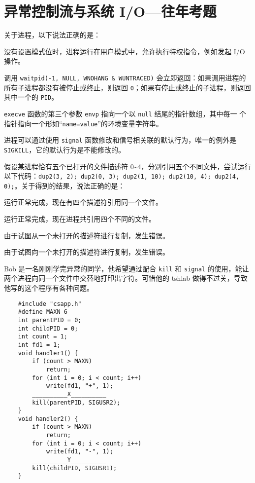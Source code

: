 \chapter{异常控制流与系统 I/O{---}往年考题}\thispagestyle{empty}
    \begin{problems}
         关于进程，以下说法正确的是：
        \begin{choices}
            \item 没有设置模式位时，进程运行在用户模式中，允许执行特权指令，例如发起 I/O 操作。
            \item 调用 \verb|waitpid(-1, NULL, WNOHANG & WUNTRACED)| 会立即返回：如果调用进程的所有子进程都没有被停止或终止，则返回 \verb|0|；如果有停止或终止的子进程，则返回其中一个的 \verb|PID|。
            \item \verb|execve| 函数的第三个参数 \verb|envp| 指向一个以 \verb|null| 结尾的指针数组，其中每一 个指针指向一个形如“\verb|name=value|”的环境变量字符串。
            \item 进程可以通过使用 \verb|signal| 函数修改和信号相关联的默认行为，唯一的例外是 \verb|SIGKILL|，它的默认行为是不能修改的。
        \end{choices}
         假设某进程恰有五个已打开的文件描述符 0\textasciitilde4，分别引用五个不同文件，尝试运行以下代码：\verb|dup2(3, 2); dup2(0, 3); dup2(1, 10); dup2(10, 4); dup2(4, 0);|。关于得到的结果，说法正确的是：
        \begin{choices}
            \item 运行正常完成，现在有四个描述符引用同一个文件。
            \item 运行正常完成，现在进程共引用四个不同的文件。
            \item 由于试图从一个未打开的描述符进行复制，发生错误。
            \item 由于试图向一个未打开的描述符进行复制，发生错误。
        \end{choices}
         Bob 是一名刚刚学完异常的同学，他希望通过配合 \verb|kill| 和 \verb|signal| 的使用，能让两个进程向同一个文件中交替地打印出字符。可惜他的 tshlab 做得不过关，导致他写的这个程序有各种问题。
        \begin{verbatim}
    #include "csapp.h"
    #define MAXN 6
    int parentPID = 0;
    int childPID = 0;
    int count = 1;
    int fd1 = 1;
    void handler1() {
        if (count > MAXN)
            return;
        for (int i = 0; i < count; i++)
            write(fd1, "+", 1);
        __________X__________
        kill(parentPID, SIGUSR2);
    }
    void handler2() {
        if (count > MAXN)
            return;
        for (int i = 0; i < count; i++)
            write(fd1, "-", 1);
        __________Y__________
        kill(childPID, SIGUSR1);
    }


\end{verbatim}
\end{problems}
